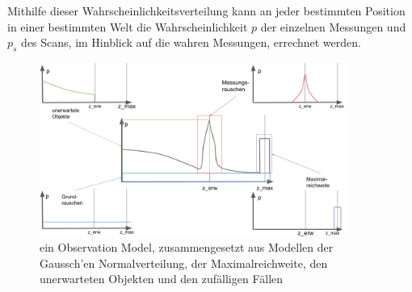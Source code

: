 Mithilfe dieser Wahrscheinlichkeitsverteilung kann an jeder bestimmten Position in einer bestimmten Welt die Wahrscheinlichkeit $p$ der einzelnen Messungen und $p_s$ des Scans, im Hinblick auf die wahren Messungen, errechnet werden.
\begin{figure}[b]
    \centering
    \includegraphics[width=0.9\textwidth]{pic/vorwissen/observation_model.png}
    \caption{ein Observation Model, zusammengesetzt aus Modellen der Gaussch'en Normalverteilung, der Maximalreichweite, den unerwarteten Objekten und den zufälligen Fällen \cite{youtube:observation_model}}
    \label{fig:observation_model}
\end{figure}

